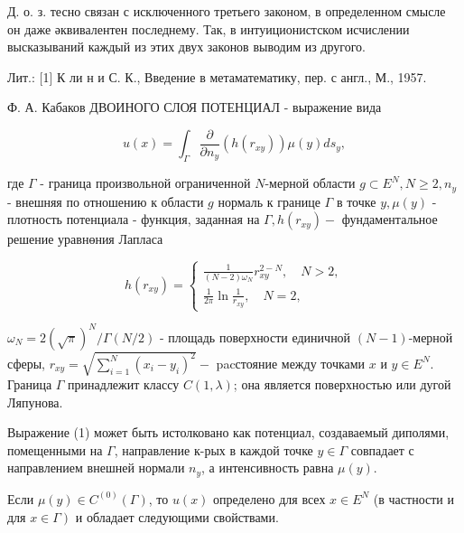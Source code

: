 \documentclass[10pt]{article}
\begin{document}
Д. о. з. тесно связан с исключенного третьего законом, в определенном смысле он даже әквивалентен последнему. Так, в интуиционистском исчислении высказываний каждый из этих двух законов выводим из другого.



Лит.: [1] К ли н и С. К., Введение в метаматематику, пер. с англ., М., 1957.



Ф. А. Кабаков ДВОИНОГО СЛОЯ ПОТЕНЦИАЛ - выражение вида



\[

u(x)=\int_{\Gamma} \frac{\partial}{\partial n_{y}}\left(h\left(r_{x y}\right)\right) \mu(y) d s_{y},

\]



где $\Gamma$ - граница произвольной ограниченной $N$-мерной области $g \subset E^{N}, N \geqslant 2, n_{y}$ - внешняя по отношению к области $g$ нормаль к границе $\Gamma$ в точке $y, \mu(y)$ - плотность потенциала - функция, заданная на $\Gamma, h\left(r_{x y}\right)-$ фундаментальное решение уравнөния Лапласа



\[

h\left(r_{x y}\right)=\left\{\begin{array}{l}

\frac{1}{(N-2) \omega_{N}} r_{x y}^{2-N}, \quad N>2, \\

\frac{1}{2 \pi} \ln \frac{1}{r_{x y}}, \quad N=2,

\end{array}\right.

\]



$\omega_{N}=2(\sqrt{\pi})^{N} / \Gamma(N / 2)$ - площадь поверхности единичной $(N-1)$-мерной сферы, $r_{x y}=\sqrt{\sum_{i=1}^{N}\left(x_{i}-y_{i}\right)^{2}}-$ pacстояние между точками $x$ и $y \in E^{N}$. Граница $\Gamma$ принадлежит классу $C(1, \lambda)$; она является поверхностью или дугой Ляпунова.



Выражение (1) может быть истолковано как потенциал, создаваемый диполями, помещенными на $\Gamma$, направление к-рых в каждой точке $y \in \Gamma$ совпадает с направлением внешней нормали $n_{y}$, а интенсивность равна $\mu(y)$.



Если $\mu(y) \in C^{(0)}(\Gamma)$, то $u(x)$ определено для всех $x \in E^{N}$ (в частности и для $\left.x \in \Gamma\right)$ и обладает следующими свойствами.
\end{document}
